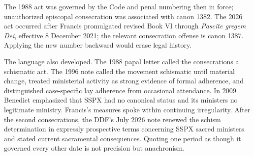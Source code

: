 The 1988 act was governed by the Code and penal numbering then in force; unauthorized episcopal consecration was associated with canon 1382. The 2026 act occurred after Francis promulgated revised Book VI through \emph{Pascite gregem Dei}, effective 8 December 2021; the relevant consecration offense is canon 1387. Applying the new number backward would erase legal history.

The language also developed. The 1988 papal letter called the consecrations a schismatic act. The 1996 note called the movement schismatic until material change, treated ministerial activity as strong evidence of formal adherence, and distinguished case-specific lay adherence from occasional attendance. In 2009 Benedict emphasized that SSPX had no canonical status and its ministers no legitimate ministry. Francis's measures spoke within continuing irregularity. After the second consecrations, the DDF's July 2026 note renewed the schism determination in expressly prospective terms concerning SSPX sacred ministers and stated current sacramental consequences. Quoting one period as though it governed every other date is not precision but anachronism.
